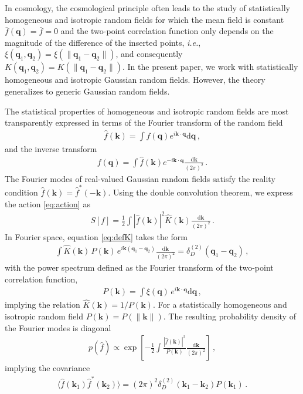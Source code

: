 \documentclass[a4paper, 11pt]{article}
\begin{document}
In cosmology, the cosmological principle often leads to the study of statistically homogeneous and isotropic random fields for which the mean field is constant $\bar{f}(\bm{q})=\bar{f}=0$ and the two-point correlation function only depends on the magnitude of the difference of the inserted points, \textit{i.e.}, $\xi(\bm{q}_1,\bm{q}_2)=\xi(\|\bm{q}_1-\bm{q}_2\|)$, and consequently $K(\bm{q}_1,\bm{q}_2)=K(\|\bm{q}_1-\bm{q}_2\|)$. In the present paper, we work with statistically homogeneous and isotropic Gaussian random fields. However, the theory generalizes to generic Gaussian random fields.

The statistical properties of homogeneous and isotropic random fields are most transparently expressed in terms of the Fourier transform of the random field
\begin{align}
\hat{f}(\bm{k}) = \int f(\bm{q})e^{i\bm{k}\cdot \bm{q}}\mathrm{d}\bm{q}\,,
\end{align}
and the inverse transform
\begin{align}
f(\bm{q}) = \int \hat{f}(\bm{k})e^{-i \bm{k} \cdot \bm{q}}\frac{\mathrm{d}\bm{k}}{(2\pi)^2}\,.
\end{align}
The Fourier modes of real-valued Gaussian random fields satisfy the reality condition $\hat{f}(\bm{k}) = \hat{f}^*(-\bm{k})$. Using the double convolution theorem, we express the action \eqref{eq:action} as
\begin{align}
S[f] = \frac{1}{2} \int |\hat{f}(\bm{k})|^2 \hat{K}(\bm{k}) \frac{\mathrm{d}\bm{k}}{(2\pi)^2}\,.
\end{align}
In Fourier space, equation \eqref{eq:defK} takes the form
\begin{align}
\int \hat{K}(\bm{k})\, P(\bm{k})\, e^{i\bm{k}(\bm{q}_1-\bm{q}_2)} \frac{\mathrm{d}\bm{k}}{(2\pi)^2} = \delta_D^{(2)}(\bm{q}_1 - \bm{q}_2)\,,
\end{align}
with the power spectrum defined as the Fourier transform of the two-point correlation function,
\begin{align}
P(\bm{k}) = \int \xi(\bm{q}) \, e^{i\bm{k}\cdot \bm{q}}\mathrm{d}\bm{q}\,,
\end{align}
implying the relation $\hat{K}(\bm{k}) = 1/P(\bm{k})$. For a statistically homogeneous and isotropic random field $P(\bm{k})=P(\|\bm{k}\|)$. The resulting probability density of the Fourier modes is diagonal
\begin{align}
p(\hat{f}) \propto \exp\left[ -\frac{1}{2} \int \frac{|\hat{f}(\bm{k})|^2}{P(\bm{k})} \frac{\mathrm{d}\bm{k}}{(2\pi)^2}\right]\,,
\end{align}
implying the covariance
\begin{align}
\langle \hat{f}(\bm{k}_1)\hat{f}^*(\bm{k}_2) \rangle = (2\pi)^2 \delta_D^{(2)}(\bm{k}_1-\bm{k}_2) P(\bm{k}_1)\,.
\end{align}
\end{document}
